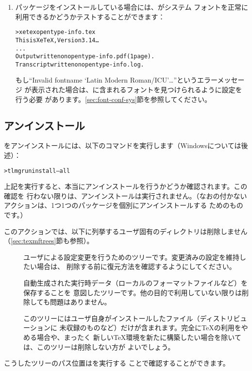\documentclass[uplatex,dvipdfmx,12pt,tombow]{jsarticle}
\begin{document}
\begin{enumerate}
\item {}パッケージをインストールしている場合には、\XeTeX がシステム
フォントを正常に利用できるかどうかテストすることができます：
%
\begin{alltt}
> xetex opentype-info.tex
This is XeTeX, Version 3.14\dots
...
Output written on opentype-info.pdf (1 page).
Transcript written on opentype-info.log.
\end{alltt}
%
もし``Invalid fontname `Latin Modern Roman/ICU'\dots''というエラーメッセージ
が表示された場合は、\TL に含まれるフォントを見つけられるように設定を行う必要
があります。\ref{sec:font-conf-sys}節を参照してください。
\end{enumerate}

\subsection{アンインストール}
\label{sec:uninstall}

\TL をアンインストールには、以下のコマンドを実行します（Windowsについては後述）：
%
\begin{alltt}
> tlmgr uninstall --all
\end{alltt}
%
上記を実行すると、本当にアンインストールを行うかどうか確認されます。この確認を
行わない限りは、アンインストールは実行されません。（なおの付かない
アクションは、1つ1つのパッケージを個別にアンインストールする
ためのものです。）

このアクションでは、以下に列挙するユーザ固有のディレクトリは削除しません
（\ref{sec:texmftrees}節も参照）。
%
\begin{description}
\item[]
ユーザによる設定変更を行うためのツリーです。変更済みの設定を維持したい場合は、
削除する前に復元方法を確認するようにしてください。

\item[]
自動生成された実行時データ（ローカルのフォーマットファイルなど）を保存することを
意図したツリーです。他の目的で利用していない限りは削除しても問題はありません。

\item[]
このツリーにはユーザ自身がインストールしたファイル（ディストリビューションに
未収録のものなど）だけが含まれます。完全に\TeX の利用をやめる場合や、まったく
新しい\TeX 環境を新たに構築したい場合を除いては、このツリーは削除しない方が
よいでしょう。
\end{description}
%
こうしたツリーのパス位置はを実行する
ことで確認することができます。
\end{document}
